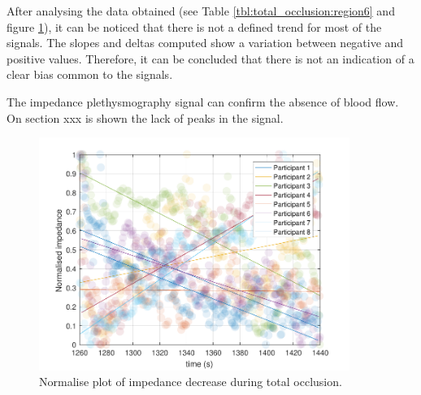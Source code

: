 After analysing the data obtained (see  Table \ref{tbl:total_occlusion:region6} and figure \ref{fig:normalise:total_occlusion}), it can be noticed that there is not a defined trend for most of the signals. The slopes and deltas computed show a variation between negative and positive values. Therefore, it can be concluded that there is not an indication of a clear bias common to the signals. 

The impedance plethysmography signal can confirm the absence of blood flow. On section xxx  is shown the lack of peaks in the signal. 

\begin{figure}
	\centering
	\includegraphics[width=0.9\textwidth,height=0.9\textheight,keepaspectratio]{figure5}    
	\caption{Normalise plot of impedance decrease during total occlusion.}
	\label{fig:normalise:total_occlusion}
\end{figure}

